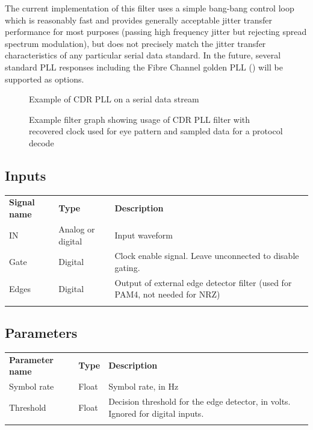 The current implementation of this filter uses a simple bang-bang control loop which is reasonably fast and provides
generally acceptable jitter transfer performance for most purposes (passing high frequency jitter but rejecting spread
spectrum modulation), but does not precisely match the jitter transfer characteristics of any particular serial data
standard. In the future, several standard PLL responses including the Fibre Channel golden PLL ()
will be supported as options.

\begin{figure}[h]
\centering
{}
\caption{Example of CDR PLL on a serial data stream}
\label{filter_cdrpll}
\end{figure}

\begin{figure}[h]
\centering
{}
\caption{Example filter graph showing usage of CDR PLL filter with recovered clock used for eye pattern and sampled
data for a protocol decode}
\label{filter_cdrpll}
\end{figure}

\FloatBarrier

\subsection{Inputs}

\begin{tabularx}{16cm}{llX}
\thickhline
\textbf{Signal name} & \textbf{Type} & \textbf{Description} \\
\thickhline
IN & Analog or digital & Input waveform \\
\thinhline
Gate & Digital & Clock enable signal. Leave unconnected to disable gating. \\
\thinhline
Edges & Digital & Output of external edge detector filter (used for PAM4, not needed for NRZ) \\
\thickhline
\end{tabularx}

\subsection{Parameters}

\begin{tabularx}{16cm}{llX}
\thickhline
\textbf{Parameter name} & \textbf{Type} & \textbf{Description} \\
\thickhline
Symbol rate & Float & Symbol rate, in Hz\\
\thinhline
Threshold & Float & Decision threshold for the edge detector, in volts. Ignored for digital inputs.\\
\thickhline
\end{tabularx}

